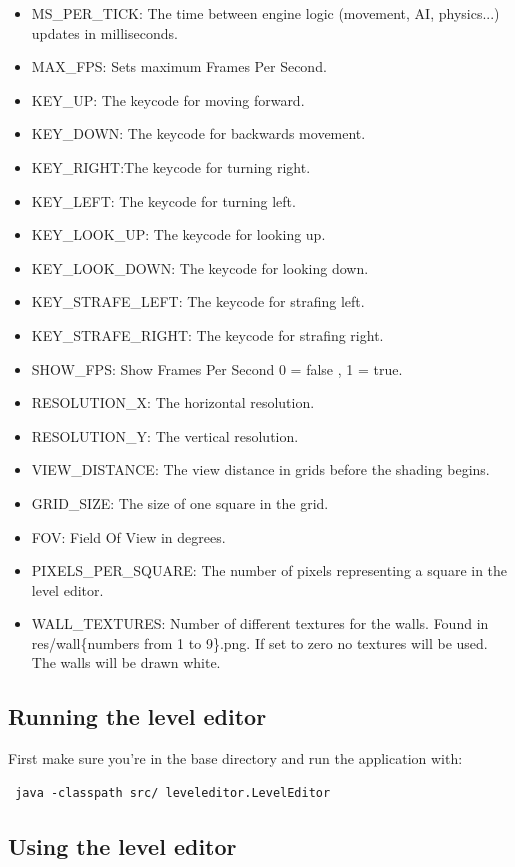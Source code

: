 \documentclass[a4paper,10pt]{article}
\begin{document}
\begin{itemize}
\item MS\_PER\_TICK: The time between engine logic (movement, AI, physics...) 
updates in milliseconds.
\item MAX\_FPS: Sets maximum Frames Per Second.
\item KEY\_UP: The keycode for moving forward.
\item KEY\_DOWN: The keycode for backwards movement.
\item KEY\_RIGHT:The keycode for turning right.
\item KEY\_LEFT: The keycode for turning left.
\item KEY\_LOOK\_UP: The keycode for looking up.
\item KEY\_LOOK\_DOWN: The keycode for looking down.
\item KEY\_STRAFE\_LEFT: The keycode for strafing left.
\item KEY\_STRAFE\_RIGHT: The keycode for strafing right.
\item SHOW\_FPS: Show Frames Per Second 0 = false , 1 = true.
\item RESOLUTION\_X: The horizontal resolution.
\item RESOLUTION\_Y: The vertical resolution.
\item VIEW\_DISTANCE: The view distance in grids before the shading begins.
\item GRID\_SIZE: The size of one square in the grid.
\item FOV: Field Of View in degrees.
\item PIXELS\_PER\_SQUARE: The number of pixels representing a square in
the level editor.
\item WALL\_TEXTURES: Number of different textures for the walls. Found in
res/wall\{numbers from 1 to 9\}.png. If set to zero no textures will be used.
The walls will be drawn white.
\end{itemize}

\subsection{Running the level editor}
First make sure you're in the base directory and run the application with:
\begin{verbatim}
 java -classpath src/ leveleditor.LevelEditor
\end{verbatim}

\subsection{Using the level editor}
\end{document}
